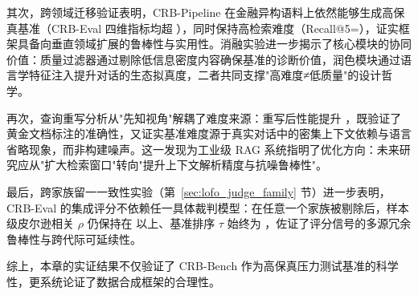 其次，跨领域迁移验证表明，CRB-Pipeline 在金融异构语料上依然能够生成高保真基准（CRB-Eval 四维指标均超 ），同时保持高检索难度（Recall@5=\TBD{}），证实框架具备向垂直领域扩展的鲁棒性与实用性。消融实验进一步揭示了核心模块的协同价值：质量过滤器通过剔除低信息密度内容确保基准的诊断价值，润色模块通过语言学特征注入提升对话的生态拟真度，二者共同支撑"高难度≠低质量"的设计哲学。

再次，查询重写分析从"先知视角"解耦了难度来源：重写后性能提升 ，既验证了黄金文档标注的准确性，又证实基准难度源于真实对话中的密集上下文依赖与语言省略现象，而非构建噪声。这一发现为工业级 RAG 系统指明了优化方向：未来研究应从"扩大检索窗口"转向"提升上下文解析精度与抗噪鲁棒性"。

最后，跨家族留一一致性实验（第~\ref{sec:lofo_judge_family} 节）进一步表明，CRB-Eval 的集成评分不依赖任一具体裁判模型：在任意一个家族被剔除后，样本级皮尔逊相关 $\rho$ 仍保持在  以上、基准排序 $\tau$ 始终为 \TBD{}，佐证了评分信号的多源冗余鲁棒性与跨代际可延续性。

综上，本章的实证结果不仅验证了 CRB-Bench 作为高保真压力测试基准的科学性，更系统论证了数据合成框架的合理性。



